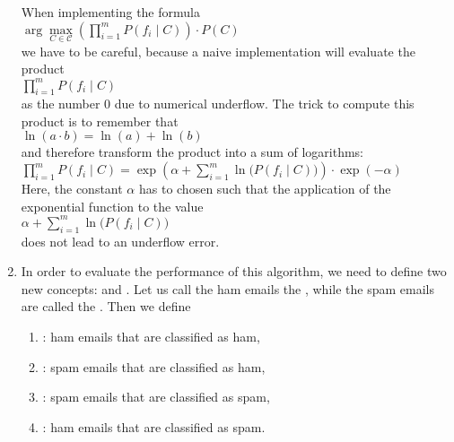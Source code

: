 \begin{enumerate}
      When implementing the formula 
      \\[0.2cm]
      \hspace*{1.3cm}
      $\arg\max\limits_{C \in \mathcal{C}}  \left(\prod\limits_{i=1}^m P(f_i \;|\; C)\right) \cdot P(C) $
      \\[0.2cm]
      we have to be careful, because a naive implementation will evaluate the product
      \\[0.2cm]
      \hspace*{1.3cm}
      $\prod\limits_{i=1}^m P(f_i \;|\; C)$
      \\[0.2cm]
      as the number $0$ due to numerical underflow.  The trick to compute this product is to remember that
      \\[0.2cm]
      \hspace*{1.3cm}
      $ \ln(a \cdot b) = \ln(a) + \ln(b) $
      \\[0.2cm]
      and therefore transform the product into a sum of logarithms:
      \\[0.2cm]
      \hspace*{1.3cm}
      $ \prod\limits_{i=1}^m P(f_i \;|\; C) = \exp\left(\alpha + \sum\limits_{i=1}^m \ln\bigl(P(f_i \;|\; C)\bigr) \right) \cdot \exp(-\alpha)$
      \\[0.2cm]
      Here, the constant $\alpha$ has to chosen such that the application of the exponential function to the value
      \\[0.2cm]
      \hspace*{1.3cm}
      $ \alpha + \sum\limits_{i=1}^m \ln\bigl(P(f_i \;|\; C)\bigr) $
      \\[0.2cm]
      does not lead to an underflow error.
\item In order to evaluate the performance of this algorithm, we need to define two new concepts:  and 
      .  Let us call the ham emails the , while the spam emails are called the
      .  Then we define
      \begin{enumerate}
      \item {}: ham emails that are classified as ham,
      \item {}: spam emails that are classified as ham,
      \item {}: spam emails that are classified as spam,
      \item {}: ham emails that are classified as spam.
      \end{enumerate}

\end{enumerate}
